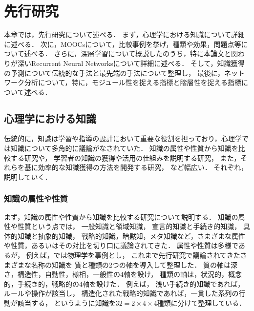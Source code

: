 \chapter{先行研究}
\label{chap:previous}
\fancyhf{}
\rhead{\thepage}
\cfoot{\thepage}

本章では，先行研究について述べる．
まず，心理学における知識について詳細に述べる．
次に，MOOCsについて，比較事例を挙げ，種類や効果，問題点等について述べる．
さらに，深層学習について概説したのうち，特に本論文と関わりが深いRecurrent Neural Networksについて詳細に述べる．
そして，知識獲得の予測について伝統的な手法と最先端の手法について整理し，
最後に，ネットワーク分析について，特に，モジュール性を捉える指標と階層性を捉える指標について述べる．




\section{心理学における知識}

伝統的に，知識は学習や指導の設計において重要な役割を担っており，心理学では知識について多角的に議論がなされていた．
知識の属性や性質から知識を比較する研究\cite{ryle1945knowing, de1996types}や，
学習者の知識の獲得や活用の仕組みを説明する研究\cite{anderson1982acquisition, anderson1993problem}，
また，それらを基に効率的な知識獲得の方法を開発する研究\cite{corbett1994knowledge}，
など幅広い．
それぞれ，説明していく．

\subsection{知識の属性や性質}
まず，知識の属性や性質から知識を比較する研究について説明する．
知識の属性や性質という点では，
一般知識と領域知識，
宣言的知識と手続き的知識，
具体的知識と抽象的知識，
戦略的知識，暗黙知，メタ知識など，さまざまな属性や性質，あるいはその対比を切り口に議論されてきた．
属性や性質は多様であるが，
例えば，\cite{de1996types}では物理学を事例とし，
これまで先行研究で議論されてきたさまざまな名称の知識を
質と種類の2つの軸を導入して整理した．
質の軸は深さ，構造性，自動性，様相，一般性の4軸を設け， 
種類の軸は，状況的，概念的，手続き的，戦略的の4軸を設けた．
例えば，
浅い手続き的知識であれば，ルールや操作が該当し，
構造化された戦略的知識であれば，一貫した系列の行動が該当する，
というように知識を$32=2\times 4\times 4$種類に分けて整理している．


